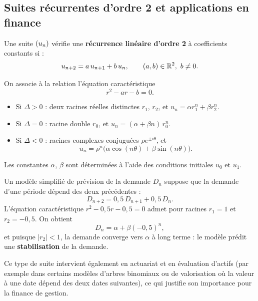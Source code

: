 \documentclass[12pt,a4paper]{article}
\begin{document}
\subsection{Suites récurrentes d'ordre 2 et applications en finance}

\begin{definitionbox}[10.4]
Une suite $(u_n)$ vérifie une \textbf{récurrence linéaire d'ordre 2} à coefficients constants si :
\[
u_{n+2} = a\, u_{n+1} + b\, u_n, \qquad (a,b)\in\mathbb{R}^2,\ b\neq 0.
\]
\end{definitionbox}

\begin{propbox}
On associe à la relation l'équation caractéristique
\[
r^2 - a r - b = 0.
\]
\begin{itemize}
  \item Si $\Delta > 0$ : deux racines réelles distinctes $r_1$, $r_2$, et $u_n = \alpha r_1^n + \beta r_2^n$.
  \item Si $\Delta = 0$ : racine double $r_0$, et $u_n = (\alpha + \beta n)\, r_0^n$.
  \item Si $\Delta < 0$ : racines complexes conjuguées $\rho e^{\pm i\theta}$, et
  \[
  u_n = \rho^n \bigl(\alpha \cos(n\theta) + \beta \sin(n\theta)\bigr).
  \]
\end{itemize}
Les constantes $\alpha$, $\beta$ sont déterminées à l'aide des conditions initiales $u_0$ et $u_1$.
\end{propbox}

\begin{gestionbox}
Un modèle simplifié de prévision de la demande $D_n$ suppose que la demande d'une période dépend des deux précédentes :
\[
D_{n+2} = 0{,}5\, D_{n+1} + 0{,}5\, D_n.
\]
L'équation caractéristique $r^2 - 0{,}5 r - 0{,}5 = 0$ admet pour racines $r_1=1$ et $r_2=-0{,}5$. On obtient
\[
D_n = \alpha + \beta (-0{,}5)^n,
\]
et puisque $\lvert r_2\rvert < 1$, la demande converge vers $\alpha$ à long terme : le modèle prédit une \textbf{stabilisation} de la demande.
\end{gestionbox}

\begin{remarquebox}[Remarque 10.1]
Ce type de suite intervient également en actuariat et en évaluation d'actifs (par exemple dans certains modèles d'arbres binomiaux ou de valorisation où la valeur à une date dépend des deux dates suivantes), ce qui justifie son importance pour la finance de gestion.
\end{remarquebox}
\end{document}
